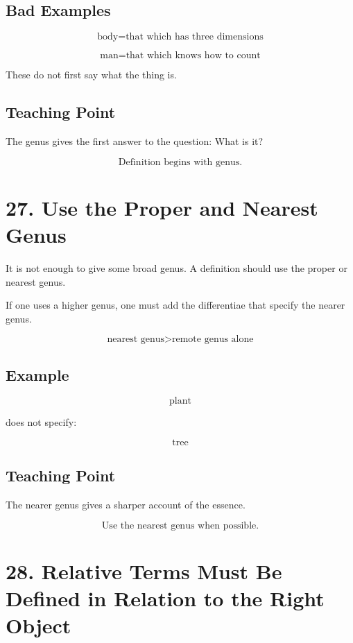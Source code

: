 \documentclass[12pt]{article}
\begin{document}
\subsection*{Bad Examples}

\[
\text{body} = \text{that which has three dimensions}
\]

\[
\text{man} = \text{that which knows how to count}
\]

These do not first say what the thing is.

\subsection*{Teaching Point}

The genus gives the first answer to the question: What is it?

\[
\boxed{
\text{Definition begins with genus.}
}
\]

\section*{27. Use the Proper and Nearest Genus}

It is not enough to give some broad genus. A definition should use the proper or
nearest genus.

If one uses a higher genus, one must add the differentiae that specify the
nearer genus.

\[
\text{nearest genus} > \text{remote genus alone}
\]

\subsection*{Example}

\[
\text{plant}
\]

does not specify:

\[
\text{tree}
\]

\subsection*{Teaching Point}

The nearer genus gives a sharper account of the essence.

\[
\boxed{
\text{Use the nearest genus when possible.}
}
\]

\section*{28. Relative Terms Must Be Defined in Relation to the Right Object}
\end{document}

